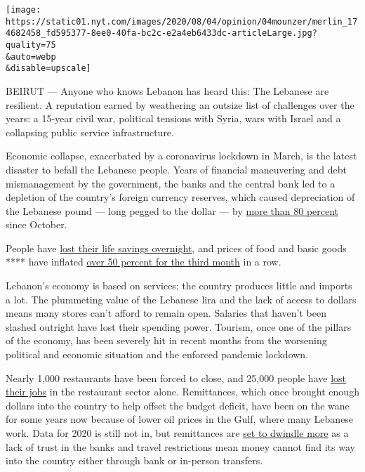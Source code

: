 \texttt{[image: https://static01.nyt.com/images/2020/08/04/opinion/04mounzer/merlin\_174682458\_fd595377-8ee0-40fa-bc2c-e2a4eb6433dc-articleLarge.jpg?quality=75\\\&auto=webp\\\&disable=upscale]}

BEIRUT --- Anyone who knows Lebanon has heard this: The Lebanese are
resilient. A reputation earned by weathering an outsize list of
challenges over the years: a 15-year civil war, political tensions with
Syria, wars with Israel and a collapsing public service infrastructure.

Economic collapse, exacerbated by a coronavirus lockdown in March, is
the latest disaster to befall the Lebanese people. Years of financial
maneuvering and debt mismanagement by the government, the banks and the
central bank led to a depletion of the country's foreign currency
reserves, which caused depreciation of the Lebanese pound --- long
pegged to the dollar --- by
\href{https://www.forbes.com/sites/tatianakoffman/2020/07/09/lebanons-currency-crisis-paves-the-way-to-a-new-future/\#5ae751526a17}{more
than 80 percent} since October.

People have
\href{https://en.annahar.com/article/1187657-lebanons-banking-crisis-risks-wiping-life-savings-of-thousands}{lost
their life savings overnight}, and prices of food and basic goods ****
have inflated
\href{https://www.reuters.com/article/us-emerging-inflation-graphic/lebanon-follows-venezuela-into-hyperinflation-wilderness-idUSKCN24O20J}{over
50 percent for the third month} in a row.

Lebanon's economy is based on services; the country produces little and
imports a lot. The plummeting value of the Lebanese lira and the lack of
access to dollars means many stores can't afford to remain open.
Salaries that haven't been slashed outright have lost their spending
power. Tourism, once one of the pillars of the economy, has been
severely hit in recent months from the worsening political and economic
situation and the enforced pandemic lockdown.

Nearly 1,000 restaurants have been forced to close, and 25,000 people
have
\href{https://www.aljazeera.com/ajimpact/lebanons-restaurants-sinking-coronavirus-lockdown-200506095822226.html}{lost
their jobs} in the restaurant sector alone. Remittances, which once
brought enough dollars into the country to help offset the budget
deficit, have been on the wane for some years now because of lower oil
prices in the Gulf, where many Lebanese work. Data for 2020 is still not
in, but remittances are
\href{https://www.middleeasteye.net/news/coronavirus-egypt-lebanon-jordan-remittance-economy}{set
to dwindle more} as a lack of trust in the banks and travel restrictions
mean money cannot find its way into the country either through bank or
in-person transfers.


